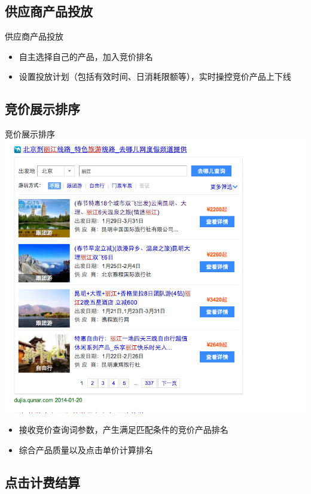 \documentclass{beamer}
\begin{document}
\begin{CJK}{UTF8}{gbsn}
\subsection{供应商产品投放}
\begin{frame}{供应商产品投放}
  \begin{itemize}
  \item {
    自主选择自己的产品，加入竞价排名
    \pause
  }
  \item {
    设置投放计划（包括有效时间、日消耗限额等），实时操控竞价产品上下线
  }
  \end{itemize}
\end{frame}


\subsection{竞价展示排序}

\begin{frame}{竞价展示排序}
  \includegraphics[scale=0.25]{./imgs/overview-baidu}
  \begin{itemize}
  \item {
    接收竞价查询词参数，产生满足匹配条件的竞价产品排名
    \pause
  }
  \item {
    综合产品质量以及点击单价计算排名
  }
  \end{itemize}
\end{frame}

\subsection{点击计费结算}


\end{CJK}
\end{document}
